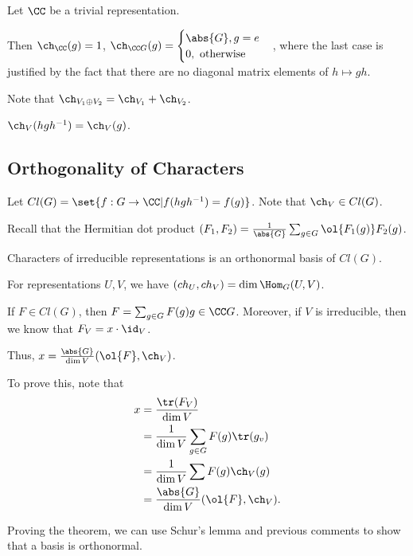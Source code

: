 \documentclass[11pt]{scrartcl}
\begin{document}
  \begin{example}

    Let $\CC$ be a trivial representation.

    Then $\ch_{\CC}(g) =1$,
    $\ch_{\CC G}(g) =
    \begin{cases}
      \abs{G}, g = e\\
      0, \text{ otherwise }
    \end{cases}$, where the last case is justified by the fact that
    there are no diagonal matrix elements of $h\mapsto gh$.

  \end{example}
  
  Note that $\ch_{V_{1}\oplus V_{2}} = \ch_{V_{1}} + \ch_{V_{2}}$.

  \begin{lemma}
    $\ch_{V}(hgh^{-1}) = \ch_{V} (g)$.
  \end{lemma}

  \subsection{Orthogonality of Characters}

  Let $Cl(G) = \set{f: G \to \CC | f(hgh^{-1}) = f(g)}$. Note that
  $\ch_{V} \in Cl(G)$.

  Recall that the Hermitian dot product
  $(F_{1}, F_{2}) = \frac{1}{\abs{G}}\sum_{g\in
    G}\ol{F_{1}(g)}F_{2}(g)$.

  \begin{theorem}
    Characters of irreducible representations is an orthonormal basis of $Cl(G)$.    
  \end{theorem}

  For representations $U, V$, we have $(ch_{U}, ch_{V}) = \dim \Hom_{G}(U, V)$.

  If $F \in Cl(G)$, then $F = \sum_{g\in G} F(g) g \in \CC G$.
  Moreover, if $V$ is irreducible, then we know that $F_{V} = x\cdot \id_{V}$.

  Thus, $x = \frac{\abs{G}}{\dim V}(\ol{F}, \ch_{V})$.

  To prove this, note that 
  \begin{align}
    x &= \frac{\tr(F_{V})}{\dim V} \\
      &= \frac{1}{\dim V} \sum_{g\in G} F(g)\tr(g_{v})\\
      &= \frac{1}{\dim V} \sum F(g) \ch_{V}(g)\\
      &= \frac{\abs{G}}{\dim V}(\ol{F}, \ch_{V}).
  \end{align}

  Proving the theorem, we can use Schur's lemma and previous comments
  to show that a basis is orthonormal.
\end{document}
